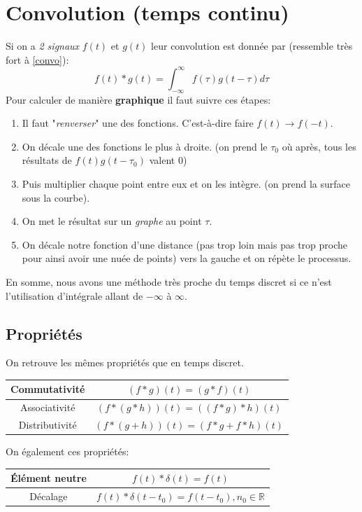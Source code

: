 \documentclass{report}
\begin{document}
\section{Convolution (temps continu)}
Si on a \textit{2 signaux} $f(t)$ et $g(t)$ leur convolution est donnée par (ressemble très fort à \ref{convo}):
\begin{equation}
f(t) \ast g(t) = \int_{-\infty}^{\infty}f(\tau)g(t-\tau)d\tau
\end{equation}
Pour calculer de manière \textbf{graphique} il faut suivre ces étapes:
\begin{enumerate}
\item Il faut "\textit{renverser}" une des fonctions. C'est-à-dire faire $f(t) \rightarrow f(-t)$.
\item On décale une des fonctions le plus à droite. (on prend le $\tau_0$ où après, tous les résultats de $f(t)g(t-\tau_0)$ valent $0$) 
\item Puis multiplier chaque point entre eux et on les intègre. (on prend la surface sous la courbe).
\item On met le résultat sur un \textit{graphe} au point $\tau$.
\item On décale notre fonction d'une distance (pas trop loin mais pas trop proche pour ainsi avoir une nuée de points) vers la gauche et on répète le processus.
\end{enumerate}
En somme, nous avons une méthode très proche du temps discret si ce n'est l'utilisation d'intégrale allant de $-\infty$ à $\infty$.

\subsection{Propriétés}
On retrouve les mêmes propriétés que en temps discret.
\begin{center}
\begin{tabular}{c|c}
	Commutativité & $(f\ast g)(t) = (g \ast f)(t)$ \\
	\hline
	Associativité & $(f \ast (g \ast h))(t) = ((f \ast g) \ast h)(t)$ \\
	\hline
	Distributivité & $(f \ast (g + h))(t) = (f \ast g + f \ast h)(t)$ \\
\end{tabular}
\end{center}
On également ces propriétés:
\begin{center}
\begin{tabular}{c|c}
	Élément neutre & $f(t) \ast \delta(t) = f(t)$ \\
	\hline
	Décalage & $f(t) \ast \delta(t-t_0) = f(t-t_0), n_0 \in \mathbb{R}$ \\
\end{tabular}
\end{center}
\end{document}
